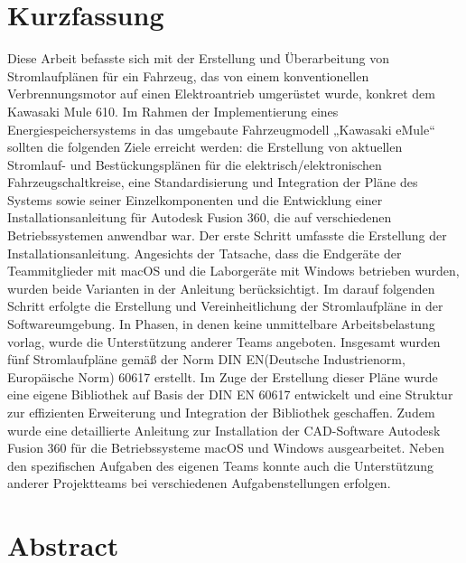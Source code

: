 \chapter*{Kurzfassung} %

Diese Arbeit befasste sich mit der Erstellung und Überarbeitung von Stromlaufplänen für ein Fahrzeug, das von einem konventionellen Verbrennungsmotor auf einen Elektroantrieb umgerüstet wurde, konkret dem Kawasaki Mule 610. Im Rahmen der Implementierung eines Energiespeichersystems in das umgebaute Fahrzeugmodell „Kawasaki eMule“ sollten die folgenden Ziele erreicht werden: die Erstellung von aktuellen Stromlauf- und Bestückungsplänen für die elektrisch/elektronischen Fahrzeugschaltkreise, eine Standardisierung und Integration der Pläne des Systems sowie seiner Einzelkomponenten und die Entwicklung einer Installationsanleitung für Autodesk Fusion 360, die auf verschiedenen Betriebssystemen anwendbar war. \newline
Der erste Schritt umfasste die Erstellung der Installationsanleitung. Angesichts der Tatsache, dass die Endgeräte der Teammitglieder mit macOS und die Laborgeräte mit Windows betrieben wurden, wurden beide Varianten in der Anleitung berücksichtigt. Im darauf folgenden Schritt erfolgte die Erstellung und Vereinheitlichung der Stromlaufpläne in der Softwareumgebung. In Phasen, in denen keine unmittelbare Arbeitsbelastung vorlag, wurde die Unterstützung anderer Teams angeboten.\newline
Insgesamt wurden fünf Stromlaufpläne gemäß der Norm DIN EN(Deutsche Industrienorm, Europäische Norm) 60617 erstellt. Im Zuge der Erstellung dieser Pläne wurde eine eigene Bibliothek auf Basis der DIN EN 60617 entwickelt und eine Struktur zur effizienten Erweiterung und Integration der Bibliothek geschaffen. Zudem wurde eine detaillierte Anleitung zur Installation der CAD-Software Autodesk Fusion 360 für die Betriebssysteme macOS und Windows ausgearbeitet. Neben den spezifischen Aufgaben des eigenen Teams konnte auch die Unterstützung anderer Projektteams bei verschiedenen Aufgabenstellungen erfolgen.


\chapter*{Abstract} %

